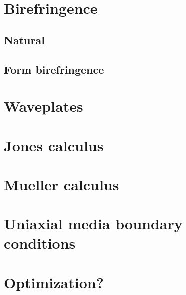 \section{Birefringence}

\subsection{Natural}

\subsection{Form birefringence}

\section{Waveplates}

\section{Jones calculus}

\section{Mueller calculus}

\section{Uniaxial media boundary conditions}

\section{Optimization?}
